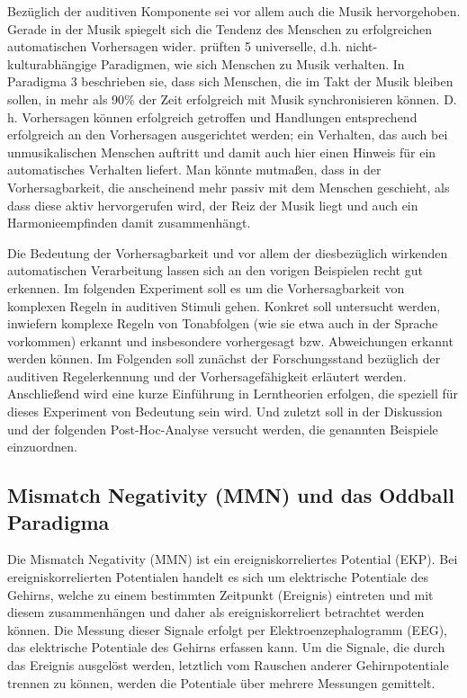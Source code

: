 \documentclass[doc,a4paper,12pt]{apa6}
\begin{document}
Bezüglich der auditiven Komponente sei vor allem auch die Musik hervorgehoben. Gerade in der Musik spiegelt sich die Tendenz des Menschen zu erfolgreichen automatischen Vorhersagen wider. \textcite{drake2001quest} prüften 5 universelle, d.h. nicht-kulturabhängige Paradigmen, wie sich Menschen zu Musik verhalten. In Paradigma 3 beschrieben sie, dass sich Menschen, die im Takt der Musik bleiben sollen, in mehr als 90\% der Zeit erfolgreich mit Musik synchronisieren können. D.\,h. Vorhersagen können erfolgreich getroffen und Handlungen entsprechend erfolgreich an den Vorhersagen ausgerichtet werden; ein Verhalten, das auch bei unmusikalischen Menschen auftritt und damit auch hier einen Hinweis für ein automatisches Verhalten liefert. Man könnte mutmaßen, dass in der Vorhersagbarkeit, die anscheinend mehr passiv mit dem Menschen geschieht, als dass diese aktiv hervorgerufen wird, der Reiz der Musik liegt und auch ein Harmonieempfinden damit zusammenhängt.

Die Bedeutung der Vorhersagbarkeit und vor allem der diesbezüglich wirkenden automatischen Verarbeitung lassen sich an den vorigen Beispielen recht gut erkennen. Im folgenden Experiment soll es um die Vorhersagbarkeit von komplexen Regeln in auditiven Stimuli gehen. Konkret soll untersucht werden, inwiefern komplexe Regeln von Tonabfolgen (wie sie etwa auch in der Sprache vorkommen) erkannt und insbesondere vorhergesagt bzw. Abweichungen erkannt werden können. Im Folgenden soll zunächst der Forschungsstand bezüglich der auditiven Regelerkennung und der Vorhersagefähigkeit erläutert werden. Anschließend wird eine kurze Einführung in Lerntheorien erfolgen, die speziell für dieses Experiment von Bedeutung sein wird. Und zuletzt soll in der Diskussion und der folgenden Post-Hoc-Analyse versucht werden, die genannten Beispiele einzuordnen.

\subsection{Mismatch Negativity (MMN) und das Oddball Paradigma}

Die Mismatch Negativity (MMN) ist ein ereigniskorreliertes Potential (EKP). Bei ereigniskorrelierten Potentialen handelt es sich um elektrische Potentiale des Gehirns, welche zu einem bestimmten Zeitpunkt (Ereignis) eintreten und mit diesem zusammenhängen und daher als ereigniskorreliert betrachtet werden können. Die Messung dieser Signale erfolgt per Elektroenzephalogramm (EEG), das elektrische Potentiale des Gehirns erfassen kann. Um die Signale, die durch das Ereignis ausgelöst werden, letztlich vom Rauschen anderer Gehirnpotentiale trennen zu können, werden die Potentiale über mehrere Messungen gemittelt.
\end{document}
